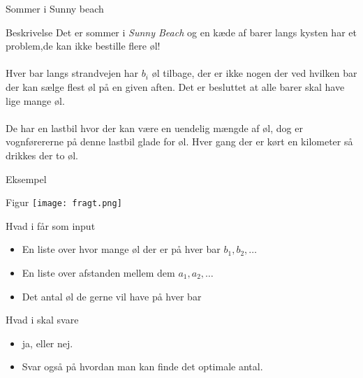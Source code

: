 \documentclass[12pt,t]{beamer}
\begin{document}
    \begin{frame}[c]{Sommer i Sunny beach}
        \begin{block}{Beskrivelse}
          Det er sommer i \emph{Sunny Beach} og en kæde af barer langs kysten
          har et problem,\pause  de kan ikke bestille flere øl!
          \\
          \pause  ~ \\
          Hver bar langs strandvejen har $b_i$ øl tilbage, der er ikke
          nogen der ved hvilken bar der kan sælge flest øl på en given aften.
          \pause
          Det er besluttet at alle barer skal have lige mange øl. \\
          \pause
          ~\\
          De har en lastbil hvor der kan være en uendelig mængde af øl, \pause
          dog er vognførererne på denne lastbil glade for øl. Hver gang der er
          kørt en kilometer så drikkes der to øl.
        \end{block}
    \end{frame}

    \begin{frame}[c]{Eksempel}
        \begin{block}{Figur}
          \texttt{[image: fragt.png]}
        \end{block}
        \pause
        \begin{block}{Hvad i får som input}
          \begin{itemize}
            \item En liste over hvor mange øl der er på hver bar $b_1, b_2, \dots$
            \item En liste over afstanden mellem dem $a_1, a_2, \dots$ \pause
            \item Det antal øl de gerne vil have på hver bar \pause
          \end{itemize}
        \end{block}

        \begin{block}{Hvad i skal svare}
          \begin{itemize}
            \item ja, eller nej. \pause
            \item Svar også på hvordan man kan finde det optimale antal.
          \end{itemize}
        \end{block}
    \end{frame}
\end{document}
